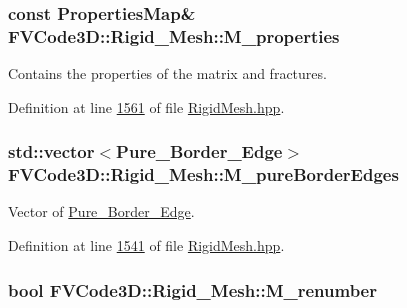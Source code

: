 \subsubsection[{\texorpdfstring{M\+\_\+properties}{M_properties}}]{\setlength{\rightskip}{0pt plus 5cm}const {\bf Properties\+Map}\& F\+V\+Code3\+D\+::\+Rigid\+\_\+\+Mesh\+::\+M\+\_\+properties\hspace{0.3cm}{\ttfamily [protected]}}\hypertarget{classFVCode3D_1_1Rigid__Mesh_a6affc34229309c2b58be292fc01bb1fc}{}\label{classFVCode3D_1_1Rigid__Mesh_a6affc34229309c2b58be292fc01bb1fc}


Contains the properties of the matrix and fractures. 



Definition at line \hyperlink{RigidMesh_8hpp_source_l01561}{1561} of file \hyperlink{RigidMesh_8hpp_source}{Rigid\+Mesh.\+hpp}.

\subsubsection[{\texorpdfstring{M\+\_\+pure\+Border\+Edges}{M_pureBorderEdges}}]{\setlength{\rightskip}{0pt plus 5cm}std\+::vector$<${\bf Pure\+\_\+\+Border\+\_\+\+Edge}$>$ F\+V\+Code3\+D\+::\+Rigid\+\_\+\+Mesh\+::\+M\+\_\+pure\+Border\+Edges\hspace{0.3cm}{\ttfamily [protected]}}\hypertarget{classFVCode3D_1_1Rigid__Mesh_a72e5bc2acebdc3bca417fa55dfd4c8c0}{}\label{classFVCode3D_1_1Rigid__Mesh_a72e5bc2acebdc3bca417fa55dfd4c8c0}


Vector of \hyperlink{classFVCode3D_1_1Rigid__Mesh_1_1Pure__Border__Edge}{Pure\+\_\+\+Border\+\_\+\+Edge}. 



Definition at line \hyperlink{RigidMesh_8hpp_source_l01541}{1541} of file \hyperlink{RigidMesh_8hpp_source}{Rigid\+Mesh.\+hpp}.

\subsubsection[{\texorpdfstring{M\+\_\+renumber}{M_renumber}}]{\setlength{\rightskip}{0pt plus 5cm}bool F\+V\+Code3\+D\+::\+Rigid\+\_\+\+Mesh\+::\+M\+\_\+renumber\hspace{0.3cm}{\ttfamily [protected]}}\hypertarget{classFVCode3D_1_1Rigid__Mesh_a3d9468c34407de926f494d4aa47af64f}{}\label{classFVCode3D_1_1Rigid__Mesh_a3d9468c34407de926f494d4aa47af64f}


